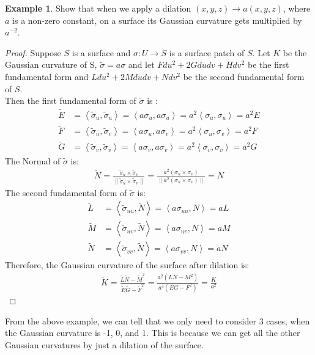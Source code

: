 \documentclass{article}
\theoremstyle{plain}
\theoremstyle{definition}
\newtheorem{example}{Example}
\theoremstyle{remark}
\begin{document}
\begin{example}
    Show that when we apply a dilation \( (x,y,z) \rightarrow a(x,y,z) \), where \(a\) is a non-zero constant, on a surface its Gaussian curvature gets multiplied by \(a^{-2}\).
\end{example}
\begin{proof}
    Suppose \( S \) is a surface and \(\sigma: U \rightarrow S \) is a surface patch of \(S\). Let \(K\) be the Gaussian curvature of S, \( \tilde{\sigma} = a\sigma \) and let \( Fdu^2 + 2Gdudv + Hdv^2 \) be the first fundamental form and \( Ldu^2 + 2Mdudv + Ndv^2 \) be the second fundamental form of \(S\). \\
    Then the first fundamental form of \( \tilde{\sigma}\) is :
    \begin{align*}
        \tilde{E} & = \left\langle \tilde{\sigma}_u, \tilde{\sigma}_u \right\rangle = \left\langle a\sigma_u, a\sigma_u \right\rangle = a^2 \left\langle \sigma_u, \sigma_u \right\rangle = a^2 E   \\
        \tilde{F} & = \left\langle \tilde{\sigma}_u, \tilde{\sigma}_v \right\rangle = \left\langle a \sigma_u, a \sigma_v \right\rangle = a^2 \left\langle \sigma_u, \sigma_v \right\rangle = a^2 F \\
        \tilde{G} & = \left\langle \tilde{\sigma}_v, \tilde{\sigma}_v \right\rangle = \left\langle a\sigma_v, a\sigma_v \right\rangle = a^2 \left\langle \sigma_v, \sigma_v \right\rangle = a^2 G
    \end{align*}
    The Normal of \( \tilde{\sigma}\) is:
    \begin{align*}
        \tilde{N} = \frac{\tilde{\sigma}_u \times  \tilde{\sigma}_v}{\left\lVert \tilde{\sigma}_u \times  \tilde{\sigma}_v\right\rVert } = \frac{a^2 (\sigma_u \times \sigma_v) }{ \left\lVert a^2 (\sigma_u \times \sigma_v) \right\rVert } = N
    \end{align*}
    The second fundamental form of \( \tilde{\sigma}\) is:
    \begin{align*}
        \tilde{L} & = \left\langle \tilde{\sigma}_{uu}, \tilde{N} \right\rangle = \left\langle a \sigma_{uu}, N \right\rangle = aL \\
        \tilde{M} & = \left\langle \tilde{\sigma}_{uv}, \tilde{N} \right\rangle = \left\langle a \sigma_{uv}, N \right\rangle = aM \\
        \tilde{N} & = \left\langle \tilde{\sigma}_{vv}, \tilde{N} \right\rangle = \left\langle a \sigma_{vv}, N \right\rangle = aN
    \end{align*}
    Therefore, the Gaussian curvature of the surface after dilation is:
    \begin{align*}
        \tilde{K} = \frac{\tilde{L}\tilde{N} - \tilde{M}^2}{\tilde{E}\tilde{G}-\tilde{F}^2} = \frac{a^2 (LN-M^2) }{ a^4( EG-F^2)} = \frac{K}{a^2}
    \end{align*}
\end{proof}
From the above example, we can tell that we only need to consider 3 cases, when the Gaussian curvature is -1, 0, and 1. This is because we can get all the other Gaussian curvatures by just a dilation of the surface.
\end{document}
